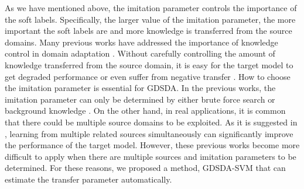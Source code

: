 As we have mentioned above, the imitation parameter controls the importance of the soft labels. Specifically, the larger value of the imitation parameter, the more important the soft labels are and more knowledge is transferred from the source domains. 
Many previous works have addressed the importance of knowledge control in domain adaptation \cite{duan2012learning,duan2012visual}. Without carefully controlling the amount of knowledge transferred from the source domain, it is easy for the target model to get degraded performance or even suffer from negative transfer \cite{pan2010survey}.
How to choose the imitation parameter is essential for GDSDA. In the previous works, the imitation parameter can only be determined by either brute force search \cite{lopez2015unifying} or background knowledge \cite{Tzeng_2015_ICCV}. On the other hand, in real applications, it is common that there could be multiple source domains to be exploited. As it is suggested in \cite{tommasi2014learning}, learning from multiple related sources simultaneously can significantly improve the performance of the target model. However, these previous works become more difficult to apply when there are multiple sources and imitation parameters to be determined.
For these reasons, we proposed a method, GDSDA-SVM that can estimate the transfer parameter automatically.



